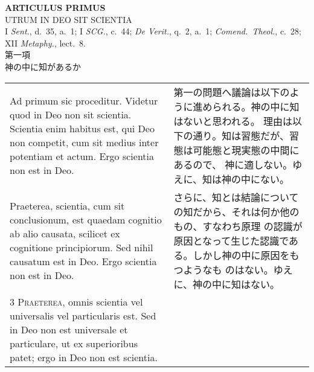 \documentclass[10pt]{jsarticle} %
\begin{document}
\newpage
{}
\begin{center}
{\Large {\bfseries ARTICULUS PRIMUS}}\\
{\large UTRUM IN DEO SIT SCIENTIA}\\
{\footnotesize I {\itshape Sent.}, d.~35, a.~1; I {\itshape SCG.}, c.~44; {\itshape De Verit.}, q.~2, a.~1; {\itshape Comend.~Theol.}, c.~28; XII {\itshape Metaphy.}, lect.~8.}\\
{\Large 第一項\\神の中に知があるか}
\end{center}

\begin{longtable}{p{21em}p{21em}}

{\huge A}{\sc d primum sic proceditur}. 
Videtur quod in Deo non sit scientia. Scientia enim habitus est, qui Deo
 non competit, cum sit medius inter potentiam et actum. Ergo scientia
 non est in Deo.

&

第一の問題へ議論は以下のように進められる。神の中に知はないと思われる。
理由は以下の通り。知は習態だが、習態は可能態と現実態の中間にあるので、
神に適しない。ゆえに、知は神の中にない。

\\

{\sc 2 Praeterea}, scientia, cum sit conclusionum, est quaedam
cognitio ab alio causata, scilicet ex cognitione principiorum. Sed
nihil causatum est in Deo. Ergo scientia non est in Deo.

&

さらに、知とは結論についての知だから、それは何か他のもの、すなわち原理
の認識が原因となって生じた認識である。しかし神の中に原因をもつようなも
のはない。ゆえに、神の中に知はない。

\\

{\scshape 3 Praeterea}, omnis scientia vel universalis vel
particularis est. Sed in Deo non est universale et particulare, ut ex
superioribus patet; ergo in Deo non est scientia.

&


\end{longtable}
\end{document}
